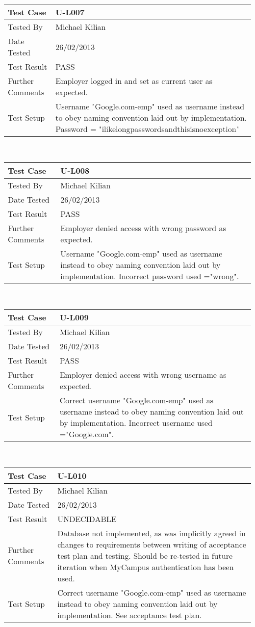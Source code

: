 \documentclass{l3deliverable}
\begin{document}
\begin{tabular}{lp{10cm}}
\hline 
\textbf{Test Case} & U-L007\tabularnewline
\hline 
\hline 
Tested By & Michael Kilian\tabularnewline
\hline 
Date Tested & 26/02/2013\tabularnewline
\hline 
Test Result & PASS\tabularnewline
\hline
Further Comments &  Employer logged in and set as current user as expected. \tabularnewline
\hline
Test Setup & Username "Google.com-emp" used as username instead to obey naming convention laid out by implementation. Password = "ilikelongpasswordsandthisisnoexception" \tabularnewline
\hline
\end{tabular}\\

\begin{tabular}{lp{10cm}}
\hline 
\textbf{Test Case} & U-L008\tabularnewline
\hline 
\hline 
Tested By & Michael Kilian\tabularnewline
\hline 
Date Tested & 26/02/2013\tabularnewline
\hline 
Test Result & PASS\tabularnewline
\hline
Further Comments &  Employer denied access with wrong password as expected. \tabularnewline
\hline
Test Setup & Username "Google.com-emp" used as username instead to obey naming convention laid out by implementation. Incorrect password used ="wrong". \tabularnewline
\hline
\end{tabular}\\

\begin{tabular}{lp{10cm}}
\hline 
\textbf{Test Case} & U-L009\tabularnewline
\hline 
\hline 
Tested By & Michael Kilian\tabularnewline
\hline 
Date Tested & 26/02/2013\tabularnewline
\hline 
Test Result & PASS\tabularnewline
\hline
Further Comments &  Employer denied access with wrong username as expected. \tabularnewline
\hline
Test Setup & Correct username "Google.com-emp" used as username instead to obey naming convention laid out by implementation. Incorrect username used ="Google.com". \tabularnewline
\hline
\end{tabular}\\

\begin{tabular}{lp{10cm}}
\hline 
\textbf{Test Case} & U-L010\tabularnewline
\hline 
\hline 
Tested By & Michael Kilian\tabularnewline
\hline 
Date Tested & 26/02/2013\tabularnewline
\hline 
Test Result & UNDECIDABLE\tabularnewline
\hline
Further Comments &   Database not implemented, as was implicitly agreed in changes to requirements between writing of acceptance test plan and testing. Should be re-tested in future iteration when MyCampus authentication has been used. \tabularnewline
\hline
Test Setup & Correct username "Google.com-emp" used as username instead to obey naming convention laid out by implementation. See acceptance test plan. \tabularnewline
\hline
\end{tabular}\\
\end{document}
